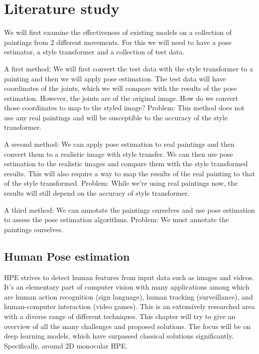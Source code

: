 \chapter{Literature study}
\label{chap:rel_work}

We will first examine the effectiveness of existing models on a collection of paintings from 2 different movements.
For this we will need to have a pose estimator, a style transformer and a collection of test data. 

A first method: We will first convert the test data with the style transformer to a painting and then we will apply pose estimation.
The test data will have coordinates of the joints, which we will compare with the results of the pose estimation.
However, the joints are of the original image. How do we convert those coordinates to map to the styled image? 
Problem: This method does not use any real paintings and will be susceptible to the accuracy of the style transformer.  

A second method: We can apply pose estimation to real paintings and then convert them to a realistic image with style transfer.
We can then use pose estimation to the realistic images and compare them with the style transformed results.
This will also require a way to map the results of the real painting to that of the style transformed. 
Problem: While we’re using real paintings now, the results will still depend on the accuracy of style transformer. 

A third method: We can annotate the paintings ourselves and use pose estimation to assess the pose estimation algorithms. 
Problem: We must annotate the paintings ourselves. 

\section{Human Pose estimation}
\label{sec:hpe}

\gls{HPE} strives to detect human features from input data such as images and videos.
It's an elementary part of computer vision with many applications among which are human action recognition (sign language), human tracking (surveillance), and human-computer interaction (video games).
This is an extensively researched area with a diverse range of different techniques.
This chapter will try to give an overview of all the many challenges and proposed solutions.
The focus will be on deep learning models, which have surpassed classical solutions significantly.
Specifically, around 2D monocular \gls{HPE}.
\cite{Munea2020}\cite{Zheng2012}\cite{Liu2104}\cite{chen2022}

